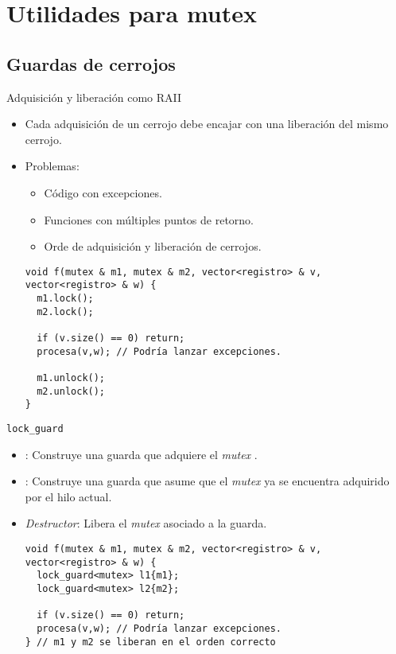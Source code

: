 \section{Utilidades para mutex}

\subsection{Guardas de cerrojos}

\begin{frame}[fragile]{Adquisición y liberación como RAII}
\begin{itemize}
  \item Cada adquisición de un cerrojo debe encajar con una liberación del mismo cerrojo.
  \item Problemas:
    \begin{itemize}
      \item Código con excepciones.
      \item Funciones con múltiples puntos de retorno.
      \item Orde de adquisición y liberación de cerrojos.
    \end{itemize}
\begin{lstlisting}
void f(mutex & m1, mutex & m2, vector<registro> & v, vector<registro> & w) {
  m1.lock();
  m2.lock();
  
  if (v.size() == 0) return;
  procesa(v,w); // Podría lanzar excepciones.
 
  m1.unlock();
  m2.unlock();
}
\end{lstlisting}
\end{itemize}
\end{frame}

\begin{frame}[fragile]{\texttt{lock\_guard}}
\begin{itemize}
  \item {}: Construye una guarda que adquiere el \emph{mutex} .
  \item {}: Construye una guarda que asume que el \emph{mutex}  ya
        se encuentra adquirido por el hilo actual.
  \item \emph{Destructor}: Libera el \emph{mutex} asociado a la guarda.
\begin{lstlisting}
void f(mutex & m1, mutex & m2, vector<registro> & v, vector<registro> & w) {
  lock_guard<mutex> l1{m1};
  lock_guard<mutex> l2{m2};
  
  if (v.size() == 0) return;
  procesa(v,w); // Podría lanzar excepciones.
} // m1 y m2 se liberan en el orden correcto
\end{lstlisting}
\end{itemize}
\end{frame}

